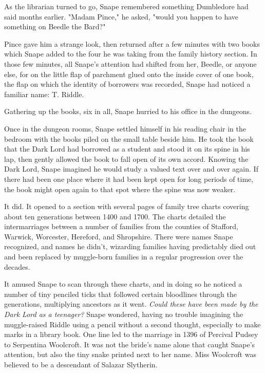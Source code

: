 \documentclass[a4paper,11pt]{article}
\begin{document}
As the librarian turned to go, Snape remembered something Dumbledore had said months earlier. "Madam Pince," he asked, "would you happen to have something on Beedle the Bard?"

Pince gave him a strange look, then returned after a few minutes with two books which Snape added to the four he was taking from the family history section. In those few minutes, all Snape's attention had shifted from her, Beedle, or anyone else, for on the little flap of parchment glued onto the inside cover of one book, the flap on which the identity of borrowers was recorded, Snape had noticed a familiar name: T. Riddle.

Gathering up the books, six in all, Snape hurried to his office in the dungeons.

Once in the dungeon rooms, Snape settled himself in his reading chair in the bedroom with the books piled on the small table beside him. He took the book that the Dark Lord had borrowed as a student and stood it on its spine in his lap, then gently allowed the book to fall open of its own accord. Knowing the Dark Lord, Snape imagined he would study a valued text over and over again. If there had been one place where it had been kept open for long periods of time, the book might open again to that spot where the spine was now weaker.

It did. It opened to a section with several pages of family tree charts covering about ten generations between 1400 and 1700. The charts detailed the intermarriages between a number of families from the counties of Stafford, Warwick, Worcester, Hereford, and Shropshire. There were names Snape recognized, and names he didn't, wizarding families having predictably died out and been replaced by muggle-born families in a regular progression over the decades.

It amused Snape to scan through these charts, and in doing so he noticed a number of tiny penciled ticks that followed certain bloodlines through the generations, multiplying ancestors as it went. \emph{Could these have been made by the Dark Lord as a teenager?} Snape wondered, having no trouble imagining the muggle-raised Riddle using a pencil without a second thought, especially to make marks in a library book. One line led to the marriage in 1396 of Percival Pudsey to Serpentina Woolcroft. It was not the bride's name alone that caught Snape's attention, but also the tiny snake printed next to her name. Miss Woolcroft was believed to be a descendant of Salazar Slytherin.
\end{document}
